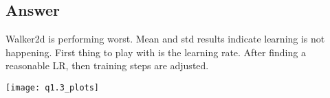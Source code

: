 \documentclass[11pt]{article}
\begin{document}
    \subsection{Answer}

    Walker2d is performing worst.
    Mean and std results indicate learning is not happening.
    First thing to play with is the learning rate.
    After finding a reasonable LR, then training steps are adjusted.

    \hspace*{-1.5in}
    \texttt{[image: q1.3\_plots]}
\end{document}
